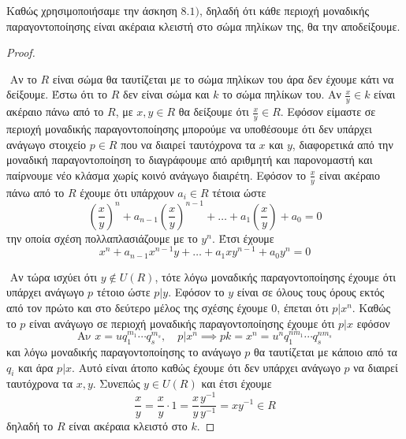 \documentclass[oneside,a4paper]{article}
\begin{document}
\pagebreak
\noindent Καθώς χρησιμοποιήσαμε την άσκηση $8.1)$, δηλαδή ότι κάθε περιοχή μοναδικής παραγοντοποίησης είναι ακέραια κλειστή στο σώμα πηλίκων της, θα την αποδείξουμε.
\vspace*{1cm}
\begin{proof} $ $

	$ $\newline
	Αν το $R$ είναι σώμα θα ταυτίζεται με το σώμα πηλίκων του άρα δεν έχουμε κάτι να δείξουμε. Έστω ότι το $R$ δεν είναι σώμα και $k$ το σώμα πηλίκων του. Αν $\frac{x}{y} \in k$ είναι ακέραιο πάνω από το $R$, με $x,y \in R$ θα δείξουμε ότι $\frac{x}{y} \in R$. Εφόσον είμαστε σε περιοχή μοναδικής παραγοντοποίησης μπορούμε να υποθέσουμε ότι δεν υπάρχει ανάγωγο στοιχείο $p \in R$ που να διαιρεί ταυτόχρονα τα $x$ και $y$, διαφορετικά από την μοναδική παραγοντοποίηση το διαγράφουμε από αριθμητή και παρονομαστή και παίρνουμε νέο κλάσμα χωρίς κοινό ανάγωγο διαιρέτη. Εφόσον το $\frac{x}{y}$ είναι ακέραιο πάνω από το $R$ έχουμε ότι υπάρχουν $a_i \in R$ τέτοια ώστε 
	$$\left(\frac{x}{y}\right)^n + a_{n-1}\left(\frac{x}{y}\right)^{n-1} + \ldots + a_1\left(\frac{x}{y}\right) + a_0 = 0$$ την οποία σχέση πολλαπλασιάζουμε με το $y^n$. Έτσι έχουμε $$x^n + a_{n-1}x^{n-1}y + \ldots + a_1 x y^{n-1} + a_0 y^n = 0$$

	$ $\newline
	Αν τώρα ισχύει ότι $y \not\in U(R)$, τότε λόγω μοναδικής παραγοντοποίησης έχουμε ότι υπάρχει ανάγωγο $p$ τέτοιο ώστε $p | y$. Εφόσον το $y$ είναι σε όλους τους όρους εκτός από τον πρώτο και στο δεύτερο μέλος της σχέσης έχουμε 0, έπεται ότι $p | x^n$. Καθώς το $p$ είναι ανάγωγο σε περιοχή μοναδικής παραγοντοποίησης έχουμε ότι $p |x$ εφόσον
	$$\text{Αν } x = u q^{m_1}_1 \cdots q^{m_s}_s, \quad p|x^n \implies pk = x^n = u^n q^{nm_1}_1 \cdots q^{nm_s}_s$$ και λόγω μοναδικής παραγοντοποίησης το ανάγωγο $p$ θα ταυτίζεται με κάποιο από τα $q_i$ και άρα $p|x$. Αυτό είναι άτοπο καθώς έχουμε ότι δεν υπάρχει ανάγωγο $p$ να διαιρεί ταυτόχρονα τα $x,y$. Συνεπώς $y \in U(R)$ και έτσι έχουμε
	$$\frac{x}{y} = \frac{x}{y}\cdot 1 = \frac{x}{y} \frac{y^{-1}}{y^{-1}} = xy^{-1} \in R$$ δηλαδή το $R$ είναι ακέραια κλειστό στο $k$. 
\end{proof}
\pagebreak
\end{document}
